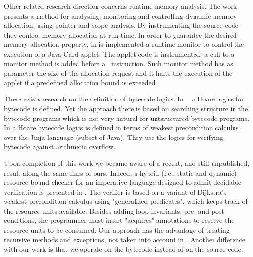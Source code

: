 Other related research direction concerns runtime memory analysis. The work \cite{GNYZ04pir} presents a method for analysing, monitoring and controlling dynamic memory allocation, using pointer and scope analysis. By instrumenting the source code they control memory allocation at run-time. In order to guarantee the desired memory allocation property, in \cite{fredlund04gcp} is implemented a runtime monitor to control the execution of a Java Card applet. The applet code is instrumented: a call to a monitor method is added before a \new\ instruction. Such monitor method has as parameter the size of the allocation request and it halts the execution of the applet if a predefined allocation bound is exceeded. 

There exists research on the definition of bytecode logics. In ~\cite{Q03plj} a Hoare logics for bytecode is defined. Yet the approach there is based on searching structure in the bytecode programs which is not very natural for untsructured bytecode programs. In \cite{WN05abs} a Hoare bytecode logics is defined in terms of weakest precondition calculus over the Jinja language (subset of Java). They use the logics for verifying bytecode against arithmetic overflow.  

Upon completion of this work we became aware of a recent, and still
unpublished, result along the same lines of ours. Indeed,  a hybrid (i.e., static and dynamic)
resource bound checker for an imperative language designed to admit
decidable verification is presented in \cite{CEILN05}. The verifier is based on a variant of Dijkstra's
weakest precondition calculus using "generalized predicates", which keeps
track of the resource units available. Besides adding loop invariants,
pre- and post-conditions, the programmer must insert "acquires"
annotations to reserve the resource units to be consumed. Our approach has
the advantage of treating recursive methods and exceptions, not taken into
account in \cite{CEILN05}. Another difference with our work is that we
operate on the bytecode instead of on the source code.




